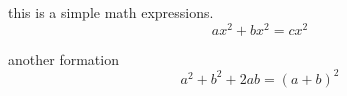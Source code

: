 \documentclass{article}
\begin{document}
	this is a simple math expressions.
	\[ax^2+bx^2=cx^2\]
	
	another formation
	\begin{equation}
		a^2+b^2+2ab=(a+b)^2
	\end{equation}
	
	
\end{document}
